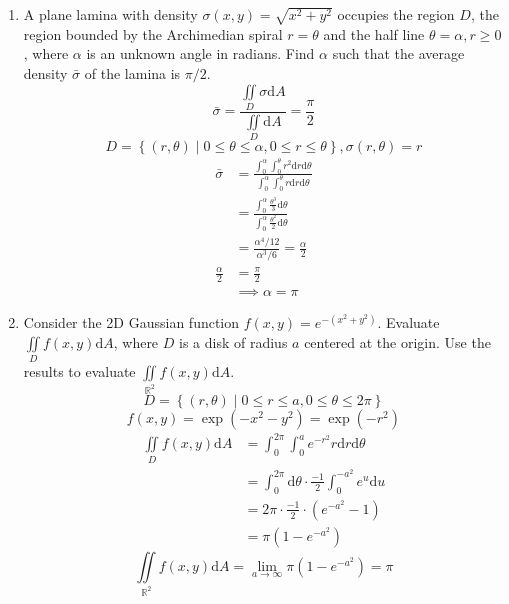 \begin{enumerate}
	\item A plane lamina with density $\sigma(x,y) = \sqrt{x^2+y^2}$ occupies the region $D$, the region bounded by the Archimedian spiral $r = \theta$ and the half line $\theta = \alpha, r \geq 0$, where $\alpha$ is an unknown angle in radians. Find $\alpha$ such that the average density $\bar{\sigma}$ of the lamina is $\pi / 2$.
	\begin{equation*}
			\bar{\sigma} = \frac{\iint\limits_{D}{\sigma\mathrm{d}A}}{\iint\limits_{D}{\mathrm{d}A}} = \frac{\pi}{2}
	\end{equation*}
	\begin{equation*}
		D = \left\{(r,\theta) \mid 0 \leq \theta \leq \alpha, 0 \leq r \leq \theta \right\}, \sigma(r,\theta) = r
	\end{equation*}
	\begin{align*}
		\bar{\sigma} &= \frac{\int_{0}^{\alpha}{\int_{0}^{\theta}{r^2\mathrm{d}r}\mathrm{d}\theta}}{\int_{0}^{\alpha}{\int_{0}^{\theta}{r\mathrm{d}r}\mathrm{d}\theta}} \\
		&= \frac{\int_{0}^{\alpha}{\frac{\theta^3}{3}\mathrm{d}\theta}}{\int_{0}^{\alpha}{\frac{\theta^2}{2}\mathrm{d}\theta}} \\
		&= \frac{\alpha^4/12}{\alpha^3/6} = \frac{\alpha}{2} \\
		\frac{\alpha}{2} &= \frac{\pi}{2} \\
		&\implies \alpha = \pi
	\end{align*}
	
	\item Consider the 2D Gaussian function $f(x,y) = e^{-(x^2+y^2)}$. Evaluate $\iint\limits_{D}{f(x,y)\mathrm{d}A}$, where $D$ is a disk of radius $a$ centered at the origin. Use the results to evaluate $\iint\limits_{\mathbb{R}^2}{f(x,y)\mathrm{d}A}$.
	\begin{equation*}
		D = \left\{(r,\theta) \mid 0 \leq r \leq a, 0 \leq \theta \leq 2\pi \right\}
	\end{equation*}
	\begin{equation*}
		f(x,y) = \exp{(-x^2-y^2)} = \exp{(-r^2)}
	\end{equation*}
	\begin{align*}
		\iint\limits_{D}{f(x,y)\mathrm{d}A} &= \int_{0}^{2\pi}{\int_{0}^{a}{e^{-r^2}r\mathrm{d}r}\mathrm{d}\theta} \\
		&= \int_{0}^{2\pi}{\mathrm{d}\theta} \cdot \frac{-1}{2}\int_{0}^{-a^2}{e^{u}\mathrm{d}u} \\
		&= 2\pi \cdot \frac{-1}{2} \cdot \left(e^{-a^2} - 1\right) \\
		&= \pi\left(1 - e^{-a^2}\right)
	\end{align*}
	\begin{equation*}
		\iint\limits_{\mathbb{R}^2}{f(x,y)\mathrm{d}A} = \lim_{a \to \infty}{\pi\left(1 - e^{-a^2}\right)} = \pi
	\end{equation*}
\end{enumerate}